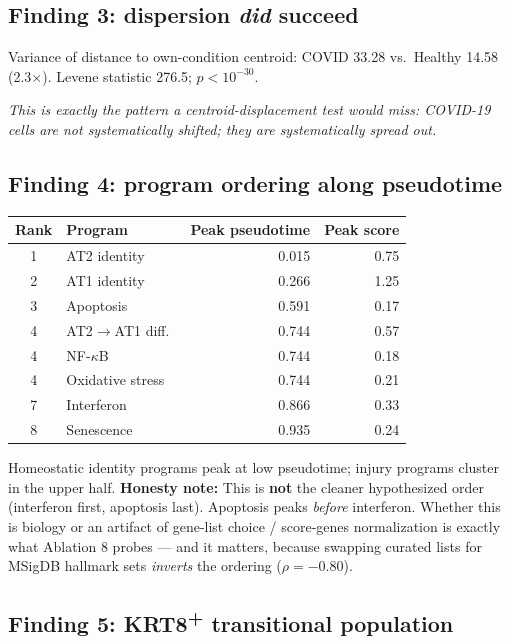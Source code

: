 \documentclass[11pt]{article}
\newcommand{\note}[1]{{\color{note}\textit{#1}}}
\newcommand{\honest}[1]{\textcolor{red!70!black}{\textbf{Honesty note:} #1}}
\begin{document}
\subsection{Finding 3: dispersion \emph{did} succeed}

Variance of distance to own-condition centroid: COVID 33.28 vs.\ Healthy 14.58 (2.3$\times$). Levene statistic 276.5; $p < 10^{-30}$.

\note{This is exactly the pattern a centroid-displacement test would \emph{miss}: COVID-19 cells are not systematically shifted; they are systematically \emph{spread out}.}

\subsection{Finding 4: program ordering along pseudotime}

\begin{table}[H]\centering\small
\begin{tabular}{clrr}
\toprule
Rank & Program & Peak pseudotime & Peak score \\ \midrule
1 & AT2 identity & 0.015 & 0.75 \\
2 & AT1 identity & 0.266 & 1.25 \\
3 & Apoptosis & 0.591 & 0.17 \\
4 & AT2$\rightarrow$AT1 diff.\ & 0.744 & 0.57 \\
4 & NF-$\kappa$B & 0.744 & 0.18 \\
4 & Oxidative stress & 0.744 & 0.21 \\
7 & Interferon & 0.866 & 0.33 \\
8 & Senescence & 0.935 & 0.24 \\ \bottomrule
\end{tabular}
\end{table}

Homeostatic identity programs peak at low pseudotime; injury programs cluster in the upper half. \honest{This is \textbf{not} the cleaner hypothesized order (interferon first, apoptosis last). Apoptosis peaks \emph{before} interferon. Whether this is biology or an artifact of gene-list choice / score-genes normalization is exactly what Ablation 8 probes --- and it matters, because swapping curated lists for MSigDB hallmark sets \emph{inverts} the ordering ($\rho = -0.80$).}

\subsection{Finding 5: KRT8\textsuperscript{+} transitional population}
\end{document}
